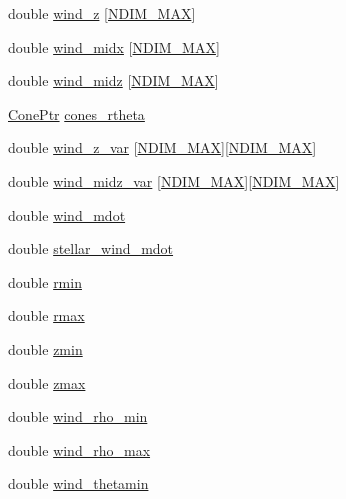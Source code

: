 \begin{DoxyCompactItemize}
double \hyperlink{structdomain_ac3bb48ac4731bd28193e92d66aa9868f}{wind\+\_\+z} \mbox{[}\hyperlink{python_8h_a80cccc8d22c78d3095c60ab2aedeb2a5}{N\+D\+I\+M\+\_\+\+M\+AX}\mbox{]}
\item 
double \hyperlink{structdomain_a6b7011ab95d96a802a079bca85943ca0}{wind\+\_\+midx} \mbox{[}\hyperlink{python_8h_a80cccc8d22c78d3095c60ab2aedeb2a5}{N\+D\+I\+M\+\_\+\+M\+AX}\mbox{]}
\item 
double \hyperlink{structdomain_a90e3e71591ed0419563a4a80008a84bb}{wind\+\_\+midz} \mbox{[}\hyperlink{python_8h_a80cccc8d22c78d3095c60ab2aedeb2a5}{N\+D\+I\+M\+\_\+\+M\+AX}\mbox{]}
\item 
\hyperlink{python_8h_a24207bf0bce7d09eb68cd114e725996d}{Cone\+Ptr} \hyperlink{structdomain_a9691a01ac9495ef917b1537b00110210}{cones\+\_\+rtheta}
\item 
double \hyperlink{structdomain_a810ac3d68f86ad671b5500152cd83be2}{wind\+\_\+z\+\_\+var} \mbox{[}\hyperlink{python_8h_a80cccc8d22c78d3095c60ab2aedeb2a5}{N\+D\+I\+M\+\_\+\+M\+AX}\mbox{]}\mbox{[}\hyperlink{python_8h_a80cccc8d22c78d3095c60ab2aedeb2a5}{N\+D\+I\+M\+\_\+\+M\+AX}\mbox{]}
\item 
double \hyperlink{structdomain_a5d14eb35cccb6c7d3d7078901dc78b95}{wind\+\_\+midz\+\_\+var} \mbox{[}\hyperlink{python_8h_a80cccc8d22c78d3095c60ab2aedeb2a5}{N\+D\+I\+M\+\_\+\+M\+AX}\mbox{]}\mbox{[}\hyperlink{python_8h_a80cccc8d22c78d3095c60ab2aedeb2a5}{N\+D\+I\+M\+\_\+\+M\+AX}\mbox{]}
\item 
double \hyperlink{structdomain_a18728816b23e527c44c331b611a726f4}{wind\+\_\+mdot}
\item 
double \hyperlink{structdomain_a970f4797bdf26152c846b84b31ae5aad}{stellar\+\_\+wind\+\_\+mdot}
\item 
double \hyperlink{structdomain_ae007f791a45e90db42de91c27654ed09}{rmin}
\item 
double \hyperlink{structdomain_ac9d475ec0bfd21ae12dae1b6c05d030d}{rmax}
\item 
double \hyperlink{structdomain_ab879cd1aeb9b7e657b17a12ea2020a1a}{zmin}
\item 
double \hyperlink{structdomain_a411d6f66a03156ee0a5870688d0a9719}{zmax}
\item 
double \hyperlink{structdomain_a88c4870706becdf39db62514c4dfbad6}{wind\+\_\+rho\+\_\+min}
\item 
double \hyperlink{structdomain_af420dea37ea0710d902daa217261d142}{wind\+\_\+rho\+\_\+max}
\item 
double \hyperlink{structdomain_a30a24da6d674f0b4383730b201d206a7}{wind\+\_\+thetamin}

\end{DoxyCompactItemize}
